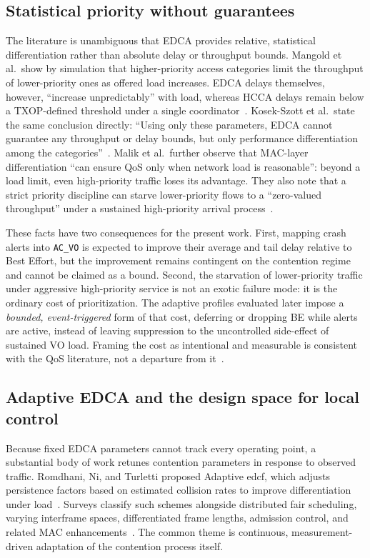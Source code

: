 \subsection{Statistical priority without guarantees}
\label{sec:bg:statistical}

The literature is unambiguous that EDCA provides relative, statistical differentiation rather than absolute delay or throughput bounds.
Mangold et al.\ show by simulation that higher-priority access categories limit the throughput of lower-priority ones as offered load increases.
EDCA delays themselves, however, ``increase unpredictably'' with load, whereas HCCA delays remain below a TXOP-defined threshold under a single coordinator~\cite{mangold2003QoS}.
Kosek-Szott et al.\ state the same conclusion directly: ``Using only these parameters, EDCA cannot guarantee any throughput or delay bounds, but only performance differentiation among the categories''~\cite{kosekszott2012What}.
Malik et al.\ further observe that MAC-layer differentiation ``can ensure QoS only when network load is reasonable'': beyond a load limit, even high-priority traffic loses its advantage.
They also note that a strict priority discipline can starve lower-priority flows to a ``zero-valued throughput'' under a sustained high-priority arrival process~\cite{Evolution_QoS_Mechanisms}.

These facts have two consequences for the present work.
First, mapping crash alerts into \texttt{AC\_VO} is expected to improve their average and tail delay relative to Best Effort, but the improvement remains contingent on the contention regime and cannot be claimed as a bound.
Second, the starvation of lower-priority traffic under aggressive high-priority service is not an exotic failure mode: it is the ordinary cost of prioritization.
The adaptive profiles evaluated later impose a \emph{bounded, event-triggered} form of that cost, deferring or dropping BE while alerts are active, instead of leaving suppression to the uncontrolled side-effect of sustained VO load.
Framing the cost as intentional and measurable is consistent with the QoS literature, not a departure from it~\cite{Evolution_QoS_Mechanisms,kosekszott2012What}.

\subsection{Adaptive EDCA and the design space for local control}
\label{sec:bg:adaptive-edca}

Because fixed EDCA parameters cannot track every operating point, a substantial body of work retunes contention parameters in response to observed traffic.
Romdhani, Ni, and Turletti proposed Adaptive \gls{edcf}, which adjusts persistence factors based on estimated collision rates to improve differentiation under load~\cite{romdhani2003AdaptiveEDCF}.
Surveys classify such schemes alongside distributed fair scheduling, varying interframe spaces, differentiated frame lengths, admission control, and related MAC enhancements~\cite{ni2004Qiang,Evolution_QoS_Mechanisms}.
The common theme is continuous, measurement-driven adaptation of the contention process itself.


